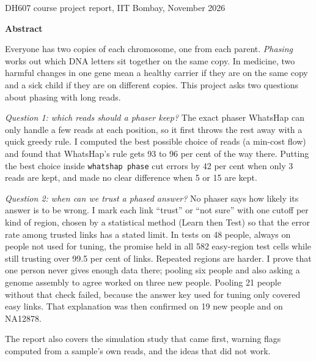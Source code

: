 \documentclass[11pt]{article}
\newcommand{\code}[1]{\texttt{#1}}
\begin{document}
\thispagestyle{empty}
\titleBC

\begin{center}
\begin{minipage}{0.9\textwidth}
\setlength{\parskip}{4pt}
\centerline{DH607 course project report, IIT Bombay, November 2026}\bigskip

\begin{center}\large\bfseries Abstract\end{center}

Everyone has two copies of each chromosome, one from each parent.
\emph{Phasing} works out which DNA letters sit together on the same copy.
In medicine, two harmful changes in one gene mean a healthy carrier if they
are on the same copy and a sick child if they are on different copies. This project asks two questions about phasing with
long reads.

\emph{Question 1: which reads should a phaser keep?} The exact phaser
WhatsHap can only handle a few reads at each position, so it first throws
the rest away with a quick greedy rule. I computed the best possible choice
of reads (a min-cost flow) and found that WhatsHap's rule gets 93 to 96 per
cent of the way there. Putting the best choice inside \code{whatshap phase}
cut errors by 42 per cent when only 3 reads are kept, and made no clear
difference when 5 or 15 are kept.

\emph{Question 2: when can we trust a phased answer?} No phaser says how
likely its answer is to be wrong. I mark each link \enquote{trust} or \enquote{not sure}
with one cutoff per kind of region, chosen by a statistical method (Learn
then Test) so that the error rate among trusted links has a stated limit.
In tests on 48 people, always on people not used for tuning, the promise
held in all 582 easy-region test cells while still trusting over 99.5 per
cent of links. Repeated regions are harder. I prove that one person never
gives enough data there; pooling six people and also asking a genome
assembly to agree worked on three new people. Pooling 21 people without that
check failed, because the answer key used for tuning only covered easy
links. That explanation was then confirmed on 19 new people and on NA12878.

The report also covers the simulation study that came first, warning flags
computed from a sample's own reads, and the ideas that did not work.
\end{minipage}
\end{center}

\newpage
\tableofcontents
\newpage
\end{document}

